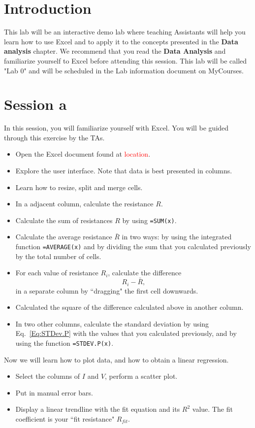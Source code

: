\documentclass[12pt]{report}
\def \todo #1{\textcolor{red}{#1}}
\begin{document}
\section{Introduction}
This lab will be an interactive demo lab where teaching Assistants will help you  learn how to use Excel and to apply it to the concepts presented in the \textbf{Data analysis} chapter. We recommend that you read the \textbf{Data Analysis} and familiarize yourself to Excel before attending this session. This lab will be called "Lab 0" and will be scheduled in the Lab information document on MyCourses. 

\section{Session a}
In this session, you will familiarize yourself with Excel. You will be guided through this exercise by the TAs.

\begin{itemize}
\item Open the Excel document found at \todo{location}.
\item Explore the user interface. Note that data is best presented in columns.
\item Learn how to resize, split and merge cells.
\item In a adjacent column, calculate the resistance $R$. 
\item Calculate the sum of resistances $R$ by using  \verb|=SUM(x)|.
\item Calculate the average resistance $\bar{R}$ in two ways: by using the integrated function  \verb|=AVERAGE(x)| and by dividing the sum that you calculated previously by the total number of cells.
\item For each value of resistance $R_i$, calculate the difference
\begin{equation}
R_i - \bar{R},
\end{equation}
in a separate column by ``dragging" the first cell downwards.

\item Calculated the square of the difference calculated above in another column.
\item In two other columns, calculate the standard deviation by using Eq.~\eqref{Eq:STDev.P} with the values that you calculated previously, and by using the function \verb|=STDEV.P(x)|. 
\end{itemize}

\noindent Now we will learn how to plot data, and how to obtain a linear regression.
\begin{itemize}
\item Select the columns of $I$ and $V$, perform a scatter plot.
\item Put in manual error bars.
\item Display a linear trendline with the fit equation and its $R^2$ value. The fit coefficient is your ``fit resistance" $R_{fit}$.
\end{itemize}
\end{document}
